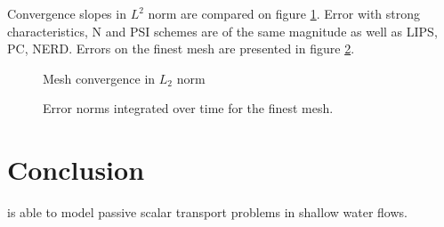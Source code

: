 Convergence slopes in $L^2$ norm are compared on figure \ref{t2d:cone:error_timeintegrals}.
Error with strong characteristics, N and PSI schemes are of the same magnitude as well as
LIPS, PC, NERD.
Errors on the finest mesh are presented in figure \ref{t2d:cone:error_timeintegrals_mesh3}.

\begin{figure}[h!]
\centering
{}
\caption{Mesh convergence in $L_2$ norm}
\label{t2d:cone:error_timeintegrals}
\end{figure}

\begin{figure}[H]
\centering
{}
\caption{Error norms integrated over time for the finest mesh.}
\label{t2d:cone:error_timeintegrals_mesh3}
\end{figure}


\section{Conclusion}
 is able to model passive scalar transport problems in shallow water flows.



